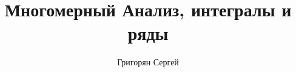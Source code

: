 

\title{Многомерный Анализ, интегралы и ряды}
\author{Григорян Сергей}


    \maketitle
    \newpage
    \tableofcontents
    \newpage
    
    


